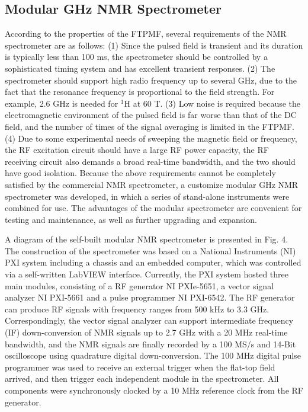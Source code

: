 \documentclass[lettersize,journal]{IEEEtran}
\begin{document}
\subsection{Modular GHz NMR Spectrometer}
According to the properties of the FTPMF, several requirements of the NMR spectrometer are as follows: (1) Since the pulsed field is transient and its duration is typically less than 100 ms, the spectrometer should be controlled by a sophisticated timing system and has excellent transient responses. (2) The spectrometer should support high radio frequency up to several GHz, due to the fact that the resonance frequency is proportional to the field strength. For example, 2.6 GHz is needed for $^1$H at 60 T. (3) Low noise is required because the electromagnetic environment of the pulsed field is far worse than that of the DC field, and the number of times of the signal averaging is limited in the FTPMF. (4) Due to some experimental needs of sweeping the magnetic field or frequency, the RF excitation circuit should have a large RF power capacity, the RF receiving circuit also demands a broad real-time bandwidth, and the two should have good isolation. Because the above requirements cannot be completely satisfied by the commercial NMR spectrometer, a customize modular GHz NMR spectrometer was developed, in which a series of stand-alone instruments were combined for use. The advantages of the modular spectrometer are convenient for testing and maintenance, as well as further upgrading and expansion.

A diagram of the self-built modular NMR spectrometer is presented in Fig. 4. The construction of the spectrometer was based on a National Instruments (NI) PXI system including a chassis and an embedded computer, which was controlled via a self-written LabVIEW interface. Currently, the PXI system hosted three main modules, consisting of a RF generator NI PXIe-5651, a vector signal analyzer NI PXI-5661 and a pulse programmer NI PXI-6542. The RF generator can produce RF signals with frequency ranges from 500 kHz to 3.3 GHz. Correspondingly, the vector signal analyzer can support intermediate frequency (IF) down-conversion of NMR signals up to 2.7 GHz with a 20 MHz real-time bandwidth, and the NMR signals are finally recorded by a 100 MS/s and 14-Bit oscilloscope using quadrature digital down-conversion. The 100 MHz digital pulse programmer was used to receive an external trigger when the flat-top field arrived, and then trigger each independent module in the spectrometer. All components were synchronously clocked by a 10 MHz reference clock from the RF generator.
\end{document}
